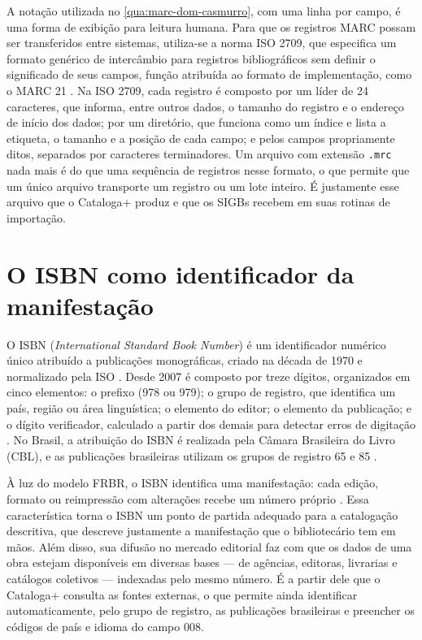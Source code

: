 A notação utilizada no \autoref{qua:marc-dom-casmurro}, com uma linha por campo, é uma forma de exibição para leitura humana. Para que os registros MARC possam ser transferidos entre sistemas, utiliza-se a norma ISO 2709, que especifica um formato genérico de intercâmbio para registros bibliográficos sem definir o significado de seus campos, função atribuída ao formato de implementação, como o MARC 21 \cite{iso2709}. Na ISO 2709, cada registro é composto por um líder de 24 caracteres, que informa, entre outros dados, o tamanho do registro e o endereço de início dos dados; por um diretório, que funciona como um índice e lista a etiqueta, o tamanho e a posição de cada campo; e pelos campos propriamente ditos, separados por caracteres terminadores. Um arquivo com extensão \texttt{.mrc} nada mais é do que uma sequência de registros nesse formato, o que permite que um único arquivo transporte um registro ou um lote inteiro. É justamente esse arquivo que o Cataloga+ produz e que os SIGBs recebem em suas rotinas de importação.

\section{O ISBN como identificador da manifestação}
\label{sec:isbn}

O ISBN (\textit{International Standard Book Number}) é um identificador numérico único atribuído a publicações monográficas, criado na década de 1970 e normalizado pela ISO \cite{isbn2017}. Desde 2007 é composto por treze dígitos, organizados em cinco elementos: o prefixo (978 ou 979); o grupo de registro, que identifica um país, região ou área linguística; o elemento do editor; o elemento da publicação; e o dígito verificador, calculado a partir dos demais para detectar erros de digitação \cite{isbn2017}. No Brasil, a atribuição do ISBN é realizada pela Câmara Brasileira do Livro (CBL), e as publicações brasileiras utilizam os grupos de registro 65 e 85 \cite{cbl2021}.

À luz do modelo FRBR, o ISBN identifica uma manifestação: cada edição, formato ou reimpressão com alterações recebe um número próprio \cite{ifla1998frbr}. Essa característica torna o ISBN um ponto de partida adequado para a catalogação descritiva, que descreve justamente a manifestação que o bibliotecário tem em mãos. Além disso, sua difusão no mercado editorial faz com que os dados de uma obra estejam disponíveis em diversas bases --- de agências, editoras, livrarias e catálogos coletivos --- indexadas pelo mesmo número. É a partir dele que o Cataloga+ consulta as fontes externas, o que permite ainda identificar automaticamente, pelo grupo de registro, as publicações brasileiras e preencher os códigos de país e idioma do campo 008.

